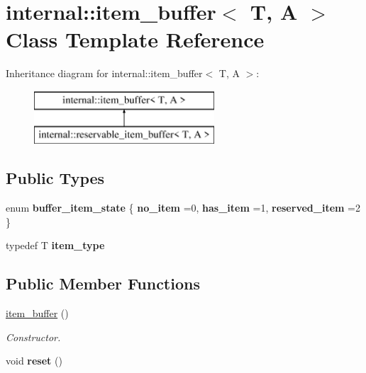 \hypertarget{classinternal_1_1item__buffer}{}\section{internal\+:\+:item\+\_\+buffer$<$ T, A $>$ Class Template Reference}
\label{classinternal_1_1item__buffer}
Inheritance diagram for internal\+:\+:item\+\_\+buffer$<$ T, A $>$\+:\begin{figure}[H]
\begin{center}
\leavevmode
\includegraphics[height=2.000000cm]{classinternal_1_1item__buffer}
\end{center}
\end{figure}
\subsection*{Public Types}
\begin{DoxyCompactItemize}
\item 
\hypertarget{classinternal_1_1item__buffer_aa9237a505da170411923d9f03fe2d675}{}enum {\bfseries buffer\+\_\+item\+\_\+state} \{ {\bfseries no\+\_\+item} =0, 
{\bfseries has\+\_\+item} =1, 
{\bfseries reserved\+\_\+item} =2
 \}\label{classinternal_1_1item__buffer_aa9237a505da170411923d9f03fe2d675}

\item 
\hypertarget{classinternal_1_1item__buffer_a0c2c1287b753750772edcfba560bc8ac}{}typedef T {\bfseries item\+\_\+type}\label{classinternal_1_1item__buffer_a0c2c1287b753750772edcfba560bc8ac}

\end{DoxyCompactItemize}
\subsection*{Public Member Functions}
\begin{DoxyCompactItemize}
\item 
\hypertarget{classinternal_1_1item__buffer_a2e59596a1c770ed3e1e979a5733bca75}{}\hyperlink{classinternal_1_1item__buffer_a2e59596a1c770ed3e1e979a5733bca75}{item\+\_\+buffer} ()\label{classinternal_1_1item__buffer_a2e59596a1c770ed3e1e979a5733bca75}

\begin{DoxyCompactList}\small\item\em Constructor. \end{DoxyCompactList}\item 
\hypertarget{classinternal_1_1item__buffer_a95803f1d3cd59b8545d6934e83aaeca6}{}void {\bfseries reset} ()\label{classinternal_1_1item__buffer_a95803f1d3cd59b8545d6934e83aaeca6}

\end{DoxyCompactItemize}
